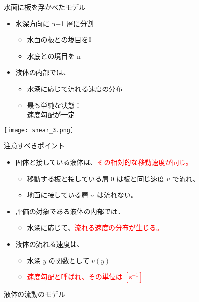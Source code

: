 \documentclass[uplatex,dvipdfmx,a4paper,11pt]{jsarticle}
\begin{document}
\begin{figure}[htb]
	\begin{center}
		\begin{minipage}{0.45\textwidth}
			\begin{itembox}[l]{水面に板を浮かべたモデル}
				\begin{itemize}
					\item 水深方向に n+1 層に分割
						\begin{itemize}
							\item 水面の板との境目を0
							\item 水底との境目を n 
						\end{itemize}
						\item 液体の内部では、
						\begin{itemize}
							\item 水深に応じて流れる速度の分布
							\item 最も単純な状態：\\速度勾配が一定
						\end{itemize}
				\end{itemize}
			\end{itembox}
		\end{minipage}
		\begin{minipage}{0.45\textwidth}
			\begin{center}
			\texttt{[image: shear\_3.png]}
			\end{center}
		\end{minipage}
		\begin{minipage}{0.9\textwidth}
			\begin{center}
			\begin{itembox}[l]{注意すべきポイント}
				\begin{itemize}
					\item 固体と接している液体は、\textcolor{red}{その相対的な移動速度が同じ。}
					\begin{itemize}
						\item 移動する板と接している層 0 は板と同じ速度 $v$ で流れ、
						\item 地面に接している層 $n$ は流れない。
					\end{itemize}
					\item 評価の対象である液体の内部では、
					\begin{itemize}
						\item 水深に応じて、\textcolor{red}{流れる速度の分布が生じる。}
					\end{itemize}
					\item 液体の流れる速度は、
					\begin{itemize}
						\item 水深 $y$ の関数として $v(y)$
						\item \textcolor{red}{速度勾配と呼ばれ、その単位は $[\mathrm{s^{-1}}]$}
					\end{itemize}
				\end{itemize}
			\end{itembox}
			\end{center}
		\end{minipage}
		\caption{液体の流動のモデル}
		\label{fig:ryudo_model}
	\end{center}
\end{figure}
\end{document}
